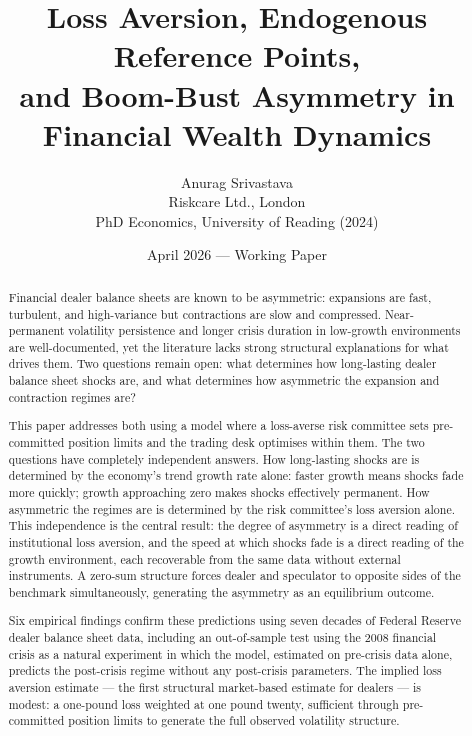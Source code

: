 \documentclass[12pt,a4paper]{article}
\title{Loss Aversion, Endogenous Reference Points,\\
       and Boom-Bust Asymmetry in Financial Wealth Dynamics}
\author{Anurag Srivastava\\
        \small Riskcare Ltd., London\\
        \small PhD Economics, University of Reading (2024)}
\date{April 2026 --- Working Paper}
\theoremstyle{definition}
\begin{document}
\maketitle


\begin{abstract}
Financial dealer balance sheets are known to be asymmetric: expansions
are fast, turbulent, and high-variance but contractions are slow and
compressed. Near-permanent volatility persistence and longer crisis
duration in low-growth environments are well-documented, yet the
literature lacks strong structural explanations for what drives them.
Two questions remain open: what determines how long-lasting dealer
balance sheet shocks are, and what determines how asymmetric the
expansion and contraction regimes are?

This paper addresses both using a model where a loss-averse risk
committee sets pre-committed position limits and the trading desk
optimises within them. The two questions have completely independent
answers. How long-lasting shocks are is determined by the economy's
trend growth rate alone: faster growth means shocks fade more quickly;
growth approaching zero makes shocks effectively permanent. How
asymmetric the regimes are is determined by the risk committee's loss
aversion alone. This independence is the central result: the degree of
asymmetry is a direct reading of institutional loss aversion, and the
speed at which shocks fade is a direct reading of the growth
environment, each recoverable from the same data without external
instruments. A zero-sum structure forces dealer and speculator to
opposite sides of the benchmark simultaneously, generating the asymmetry
as an equilibrium outcome.

Six empirical findings confirm these predictions using seven decades of
Federal Reserve dealer balance sheet data, including an out-of-sample
test using the 2008 financial crisis as a natural experiment in which
the model, estimated on pre-crisis data alone, predicts the post-crisis
regime without any post-crisis parameters. The implied loss aversion
estimate --- the first structural market-based estimate for dealers ---
is modest: a one-pound loss weighted at one pound twenty, sufficient
through pre-committed position limits to generate the full observed
volatility structure.\end{abstract}
\end{document}
